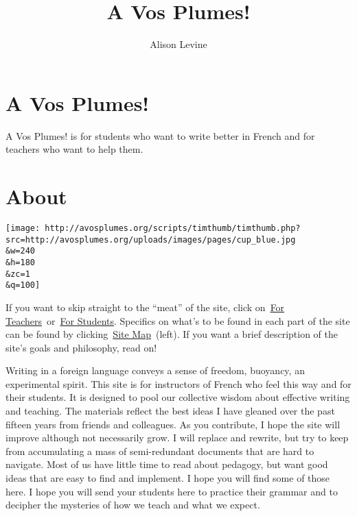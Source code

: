 \documentclass[
  letterpaper,
  DIV=11,
  numbers=noendperiod]{scrreprt}
\title{A Vos Plumes!}
\author{Alison Levine}
\date{}
\renewcommand*\contentsname{Table of contents}
\newcommand\contentsname{Table of contents}
\begin{document}
\maketitle
\ifdefined\Shaded\renewenvironment{Shaded}{\begin{tcolorbox}[boxrule=0pt, breakable, enhanced, frame hidden, sharp corners, borderline west={3pt}{0pt}{shadecolor}, interior hidden]}{\end{tcolorbox}}\fi

\renewcommand*\contentsname{Table of contents}
{
\hypersetup{linkcolor=}
\setcounter{tocdepth}{2}
\tableofcontents
}

\hypertarget{a-vos-plumes}{%
\chapter{A Vos Plumes!}\label{a-vos-plumes}}

A Vos Plumes! is for students who want to write better in French and for
teachers who want to help them.


\hypertarget{about}{%
\chapter{About}\label{about}}

\texttt{[image: http://avosplumes.org/scripts/timthumb/timthumb.php?src=http://avosplumes.org/uploads/images/pages/cup\_blue.jpg\\\&w=240\\\&h=180\\\&zc=1\\\&q=100]}

If you want to skip straight to the ``meat'' of the site, click
on~\href{http://avosplumes.org/teachers/}{For
Teachers}~or~\href{http://avosplumes.org/students/}{For Students}.
Specifics on what's to be found in each part of the site can be found by
clicking~\href{http://avosplumes.org/about/site-map/}{Site Map}~(left).
If you want a brief description of the site's goals and philosophy, read
on!

Writing in a foreign language conveys a sense of freedom, buoyancy, an
experimental spirit. This site is for instructors of French who feel
this way and for their students. It is designed to pool our collective
wisdom about effective writing and teaching. The materials reflect the
best ideas I have gleaned over the past fifteen years from friends and
colleagues. As you contribute, I hope the site will improve although not
necessarily grow. I will replace and rewrite, but try to keep from
accumulating a mass of semi-redundant documents that are hard to
navigate. Most of us have little time to read about pedagogy, but want
good ideas that are easy to find and implement. I hope you will find
some of those here. I hope you will send your students here to practice
their grammar and to decipher the mysteries of how we teach and what we
expect.
\end{document}

